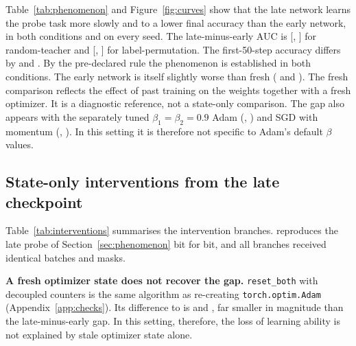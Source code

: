 Table~\ref{tab:phenomenon} and Figure~\ref{fig:curves} show that the late network learns the probe task
more slowly and to a lower final accuracy than the early network, in both conditions and on every seed.
The late-minus-early AUC is \RTLateMinusEarlyAuc{} [\RTLateMinusEarlyAucMin, \RTLateMinusEarlyAucMax]
for random-teacher and \LPLateMinusEarlyAuc{} [\LPLateMinusEarlyAucMin, \LPLateMinusEarlyAucMax] for
label-permutation. The first-50-step accuracy differs by \RTLateMinusEarlyEarlyAcc{} and
\LPLateMinusEarlyEarlyAcc{}. By the pre-declared rule the phenomenon is established in both conditions.
The early network is itself slightly worse than fresh (\RTEarlyMinusFreshAuc{} and
\LPEarlyMinusFreshAuc{}). The fresh comparison reflects the effect of past training on the weights
together with a fresh optimizer. It is a diagnostic reference, not a state-only comparison. The gap also
appears with the separately tuned $\beta_1{=}\beta_2{=}0.9$ Adam (\RTAdamEqBetaLateMinusEarlyAuc{},
\LPAdamEqBetaLateMinusEarlyAuc{}) and SGD with momentum (\RTSgdLateMinusEarlyAuc{},
\LPSgdLateMinusEarlyAuc{}). In this setting it is therefore not specific to Adam's default $\beta$ values.

\subsection{State-only interventions from the late checkpoint}
\label{sec:interventions}

\begin{table}[t]
\caption{Interventions on the late checkpoint. $\Delta$: probe-AUC difference to \keep{} and to the
intervention's update-norm control, mean [seed range]. Update norms and descriptive statistics are in
Appendix~\ref{app:descriptive}. $^\dagger$Mis-corrected artifact controls (counter not reset), not
candidate methods.}
\label{tab:interventions}
\centering\scriptsize\setlength{\tabcolsep}{3pt}

\end{table}

Table~\ref{tab:interventions} summarises the intervention branches. \keep{} reproduces the late probe of
Section~\ref{sec:phenomenon} bit for bit, and all branches received identical batches and masks.

\textbf{A fresh optimizer state does not recover the gap.} \texttt{reset\_both} with decoupled counters
is the same algorithm as re-creating \texttt{torch.optim.Adam} (Appendix~\ref{app:checks}). Its
difference to \keep{} is \RTResetBothVsKeep{} and \LPResetBothVsKeep{}, far smaller in magnitude than
the late-minus-early gap. In this setting, therefore, the loss of learning ability is not explained by
stale optimizer state alone.


